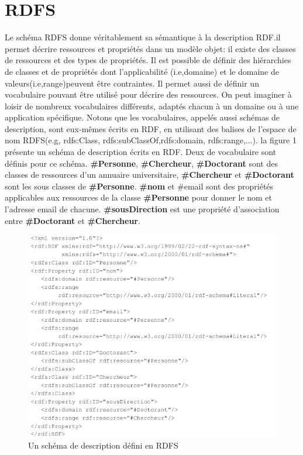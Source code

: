 \documentclass[12pt]{report}
\begin{document}
\section{RDFS}
Le schéma RDFS donne véritablement sa sémantique à la description RDF\cite{RDFS}.il
permet décrire ressources et propriétés dans un modèle objet: il existe des
classes de ressources et des types de propriétés. Il est possible de définir des
hiérarchies de classes et de propriétés dont l’applicabilité (i.e,domaine) et le
domaine de valeurs(i.e,range)peuvent être contraintes.
Il permet aussi de définir un vocabulaire pouvant être utilisé pour décrire des
ressources.
On peut imaginer à loisir de nombreux vocabulaires différents, adaptés chacun à
un domaine ou à une application spécifique. Notons que les vocabulaires,
appelés aussi schémas de description, sont eux-mêmes écrits en RDF, en
utilisant des balises de l'espace de nom RDFS(e.g, rdfs:Class,
rdfs:subClassOf,rdfs:domain, rdfs:range,...). la figure 1 présente un schéma de
description écrits en RDF. Deux de vocabulaire sont définis pour ce schéma.
\textbf{\#Personne}, \textbf{\#Chercheur}, \textbf{\#Doctorant} sont des classes de ressources d'un
annuaire universitaire, \textbf{\#Chercheur} et \textbf{\#Doctorant} sont les sous classes de
\textbf{\#Personne}. \textbf{\#nom} et {\#email} sont des propriétés applicables aux ressources de la
classe \textbf{\#Personne} pour donner le nom et l'adresse email de chacune.
\textbf{\#sousDirection} est une propriété d'association entre \textbf{\#Doctorant} et
\textbf{\#Chercheur}.
\begin{figure}[t]
\centering
\includegraphics[width=\textwidth]{rdfs_example.png}
\caption{Un schéma de description défini en RDFS}
\end{figure}
\end{document}

